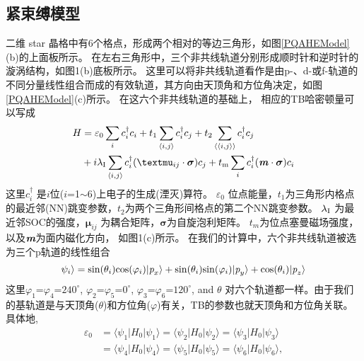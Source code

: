 \subsection{紧束缚模型}
二维 star 晶格中有6个格点，形成两个相对的等边三角形，如图\ref{PQAHEModel}(b)的上面板所示。 在左右三角形中，三个非共线轨道分别形成顺时针和逆时针的漩涡结构，如图1(b)底板所示。 
这里可以将非共线轨道看作是由p-、d-或f-轨道的不同分量线性组合而成的有效轨道，其方向由天顶角和方位角决定，如图\ref{PQAHEModel}(c)所示。 在这六个非共线轨道的基础上，
相应的TB哈密顿量可以写成 
{\setlength\belowdisplayskip{1pt}
\begin{equation}
\begin{split}
H&=\varepsilon_0\sum_{i}c_i^\dag c_i+t_1\sum_{\langle i,j\rangle}c_i^\dag c_j+t_2\sum_{\langle\langle i,j\rangle\rangle}c_i^\dag c_j \\
&+i\lambda{\rm_I}\sum_{\langle i,j\rangle}c_i^\dag(\bm{\mu}_{ij}\cdot\bm{\sigma})c_j+t{\rm_m}\sum_ic_i^\dag(\textbf{\textit{m}}\cdot\bm{\sigma})c_i
\end{split}
\end{equation}}
这里$c_i^\dag$ 是$i$位($i$=1$\sim$6)上电子的生成(湮灭)算符。 $\varepsilon_0$ 位点能量，$t_1$为三角形内格点的最近邻(NN)跳变参数，$t_2$为两个三角形间格点的第二个NN跳变参数。
$\lambda{\rm_I}$ 为最近邻SOC的强度，$\bm{\mu}_{ij}$ 为耦合矩阵，$\bm{\sigma}$为自旋泡利矩阵。 $t_m$为位点塞曼磁场强度，以及$\textit{\textbf{m}}$为面内磁化方向，
如图1(c)所示。 在我们的计算中，六个非共线轨道被选为三个p轨道的线性组合
\begin{equation}
  \psi_i\rangle={\rm{sin}}(\theta_i){\rm{cos}}(\varphi_i)|\textit{p}_{x}\rangle+{\rm{sin}}(\theta_i){\rm{sin}}(\varphi_i)|\textit{p}_{y}\rangle +{\rm{cos}}(\theta_i)|\textit{p}_{z}\rangle
\end{equation}
这里$\varphi_1$=$\varphi_4$=$240^\circ$, $\varphi_2$=$\varphi_5$=$0^\circ$, $\varphi_3$=$\varphi_6$=$120^\circ$,
and $\theta$ 对六个轨道都一样。由于我们的基轨道是与天顶角($\theta$)和方位角($\varphi$)有关，TB的参数也就天顶角和方位角关联。
具体地,
\begin{equation*}
  \begin{split}
  \varepsilon_0  &= \langle \psi_1 | H_0 |  \psi_1 \rangle = \langle \psi_2 | H_0 |  \psi_2 \rangle = \langle \psi_3 | H_0 |  \psi_3 \rangle \\
                 &= \langle \psi_4 | H_0 |  \psi_4 \rangle = \langle \psi_5 | H_0 |  \psi_5 \rangle = \langle \psi_6 | H_0 |  \psi_6 \rangle,
  \end{split}
\end{equation*}

